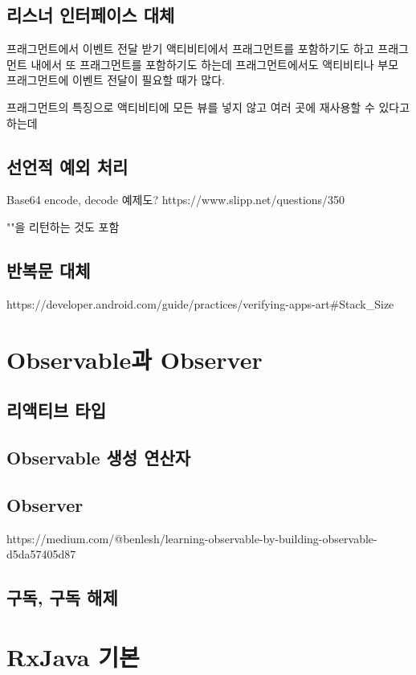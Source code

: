 \documentclass{book}
\begin{document}
\section{리스너 인터페이스 대체}
프래그먼트에서 이벤트 전달 받기
액티비티에서 프래그먼트를 포함하기도 하고 프래그먼트 내에서 또 프래그먼트를 포함하기도 하는데 프래그먼트에서도 액티비티나 부모 프래그먼트에 이벤트 전달이 필요할 때가 많다.

프래그먼트의 특징으로 액티비티에 모든 뷰를 넣지 않고 여러 곳에 재사용할 수 있다고 하는데 

\section{선언적 예외 처리}
Base64 encode, decode 예제도?
https://www.slipp.net/questions/350

""을 리턴하는 것도 포함

\section{반복문 대체}
https://developer.android.com/guide/practices/verifying-apps-art#Stack_Size

\chapter{Observable과 Observer}
\section{리액티브 타입}
\section{Observable 생성 연산자}
\section{Observer}
https://medium.com/@benlesh/learning-observable-by-building-observable-d5da57405d87

\section{구독, 구독 해제}

\chapter{RxJava 기본}
\end{document}
